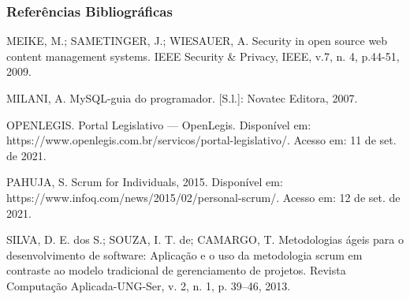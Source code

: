 \documentclass[xcolor=table]{beamer}
\begin{document}
\begin{frame}
    \frametitle{Referências Bibliográficas}
    \scriptsize{
        MEIKE, M.; SAMETINGER, J.; WIESAUER, A. Security in open source web content management systems. IEEE Security & Privacy, IEEE, v.7, n. 4, p.44-51, 2009. \newline

        MILANI, A. MySQL-guia do programador. [S.l.]: Novatec Editora, 2007. \newline

        OPENLEGIS. Portal Legislativo — OpenLegis. Disponível em: https://www.openlegis.com.br/servicos/portal-legislativo/. Acesso em: 11 de set. de 2021. \newline
        
        PAHUJA, S. Scrum for Individuals, 2015. Disponível em: https://www.infoq.com/news/2015/02/personal-scrum/. Acesso em: 12 de set. de 2021. \newline

        SILVA, D. E. dos S.; SOUZA, I. T. de; CAMARGO, T. Metodologias ágeis para o desenvolvimento de software: Aplicação e o uso da metodologia scrum em contraste ao modelo tradicional de gerenciamento de projetos. Revista Computação Aplicada-UNG-Ser, v. 2, n. 1, p. 39–46, 2013. \newline
    }
\end{frame}
\end{document}
